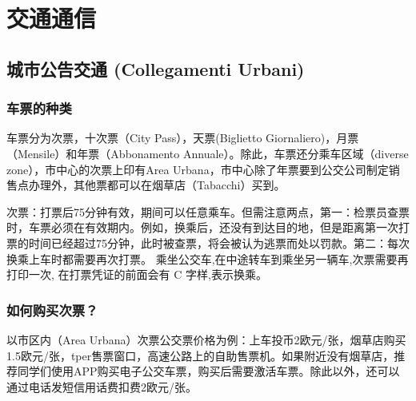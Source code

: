 
% 


\chapter{交通通信}                 %

\section{城市公告交通 (Collegamenti Urbani)}

\subsection{车票的种类}
车票分为次票，十次票（City Pass），天票(Biglietto Giornaliero)，月票（Mensile）和年票（Abbonamento Annuale）。除此，车票还分乘车区域（diverse zone），市中心的次票上印有Area Urbana，市中心除了年票要到公交公司制定销售点办理外，其他票都可以在烟草店（Tabacchi）买到。

次票：打票后75分钟有效，期间可以任意乘车。但需注意两点，第一：检票员查票时，车票必须在有效期内。例如，换乘后，还没有到达目的地，但是距离第一次打票的时间已经超过75分钟，此时被查票，将会被认为逃票而处以罚款。第二：每次换乘上车时都需要再次打票。
乘坐公交车,在中途转车到乘坐另一辆车,次票需要再打印一次, 在打票凭证的前面会有 C 字样,表示换乘。

\subsection{如何购买次票？}
以市区内（Area Urbana）次票公交票价格为例：上车投币2欧元/张，烟草店购买1.5欧元/张，tper售票窗口，高速公路上的自助售票机。如果附近没有烟草店，推荐同学们使用APP购买电子公交车票，购买后需要激活车票。除此以外，还可以通过电话发短信用话费扣费2欧元/张。

